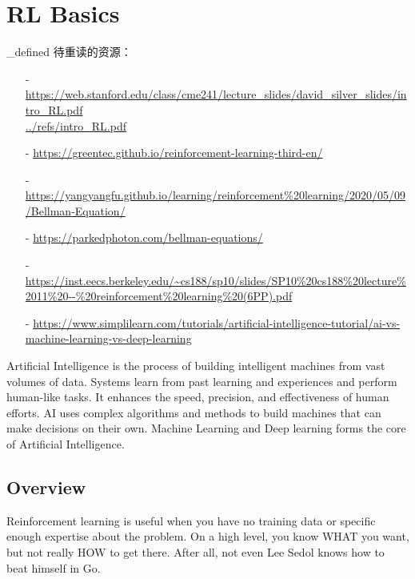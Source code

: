 

\chapter{RL Basics}\label{rl_basics}
\setcounter{section}{-1}

\ifx\never_defined
待重读的资源：
\begin{itemize}
\setlength{\parskip}{0pt}
\item[-]
\url{https://web.stanford.edu/class/cme241/lecture_slides/david_silver_slides/intro_RL.pdf} \\
\url{../refs/intro_RL.pdf}

\item[-]
\url{https://greentec.github.io/reinforcement-learning-third-en/}

\item[-]
\url{https://yangyangfu.github.io/learning/reinforcement%20learning/2020/05/09/Bellman-Equation/}

\item[-]
\url{https://parkedphoton.com/bellman-equations/}

\item[-]
\url{https://inst.eecs.berkeley.edu/~cs188/sp10/slides/SP10%20cs188%20lecture%2011%20--%20reinforcement%20learning%20(6PP).pdf}

\item[-]
\url{https://www.simplilearn.com/tutorials/artificial-intelligence-tutorial/ai-vs-machine-learning-vs-deep-learning}
\end{itemize}
\fi

Artificial Intelligence is the process of building intelligent machines from vast 
volumes of data. Systems learn from past learning and experiences and perform 
human-like tasks. It enhances the speed, precision, and effectiveness of human 
efforts. AI uses complex algorithms and methods to build machines that can make 
decisions on their own. Machine Learning and Deep learning forms the core of 
Artificial Intelligence. 


\section{Overview}

Reinforcement learning is useful when you have no training data or specific enough 
expertise about the problem. On a high level, you know WHAT you want, but not really 
HOW to get there. After all, not even Lee Sedol knows how to beat himself in Go.

